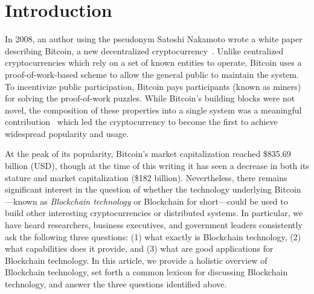 
\section{Introduction}

In 2008, an author using the pseudonym Satoshi Nakamoto wrote a white paper describing Bitcoin, a new decentralized cryptocurrency~\cite{Nak08}.
Unlike centralized cryptocurrencies which rely on a set of known entities to 
operate, Bitcoin uses a proof-of-work-based scheme to allow the general public 
to maintain the system. %
To incentivize public participation, Bitcoin pays participants (known as miners) for solving the proof-of-work puzzles.
While Bitcoin's building blocks were not novel, the composition of these properties into a single system was a meaningful contribution~\cite{Narayanan17} which led the cryptocurrency to become the first to achieve widespread popularity and usage.

At the peak of its popularity, Bitcoin's market capitalization reached \$835.69 billion (USD), though at the time of this writing it has seen a decrease in both its stature and market capitalization (\$182 billion).
Nevertheless, there remains significant interest in the question of whether the technology underlying Bitcoin---known as \emph{Blockchain technology} or {Blockchain} for short---could be used to build other interesting cryptocurrencies or distributed systems.
In particular, we have heard researchers, business executives, and government 
leaders consistently ask the following three questions: (1) what exactly is 
Blockchain technology, (2) what capabilities does it provide, and (3) what are 
good applications for Blockchain technology. 
%
In this article, 
we provide a holistic overview of Blockchain technology, set forth a common 
lexicon for discussing Blockchain technology, and answer the three questions 
identified above.

